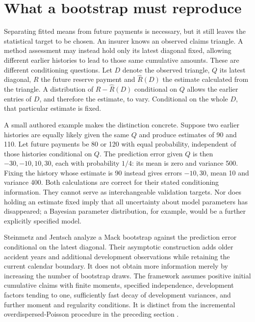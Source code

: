 \section{What a bootstrap must reproduce}
\label{sec:bootstrap-consistency}

Separating fitted means from future payments is necessary, but it still leaves
the statistical target to be chosen. An insurer knows an observed claims
triangle. A method assessment may instead hold only its latest diagonal fixed,
allowing different earlier histories to lead to those same cumulative amounts.
These are different conditioning questions. Let $D$ denote the observed
triangle, $Q$ its latest diagonal, $R$ the future reserve payment and
$\widehat R(D)$ the estimate calculated from the triangle. A distribution of
$R-\widehat R(D)$ conditional on $Q$ allows the earlier entries of $D$, and
therefore the estimate, to vary. Conditional on the whole $D$, that particular
estimate is fixed.

A small authored example makes the distinction concrete. Suppose two earlier
histories are equally likely given the same $Q$ and produce estimates of 90
and 110. Let future payments be 80 or 120 with equal probability, independent
of those histories conditional on $Q$. The prediction error given $Q$ is then
$-30,-10,10,30$, each with probability $1/4$: its mean is zero and variance
500. Fixing the history whose estimate is 90 instead gives errors $-10,30$,
mean 10 and variance 400. Both calculations are correct for their stated
conditioning information. They cannot serve as interchangeable validation
targets. Nor does holding an estimate fixed imply that all uncertainty about
model parameters has disappeared; a Bayesian parameter distribution, for
example, would be a further explicitly specified model.

Steinmetz and Jentsch analyze a Mack bootstrap against the prediction error
conditional on the latest diagonal. Their asymptotic construction adds older
accident years and additional development observations while retaining the
current calendar boundary. It does not obtain more information merely by
increasing the number of bootstrap draws. The framework assumes positive
initial cumulative claims with finite moments, specified independence,
development factors tending to one, sufficiently fast decay of development
variances, and further moment and regularity conditions. It is distinct from
the incremental overdispersed-Poisson procedure in the preceding section
\citep[Sections 2--4, especially Assumptions 2.2--2.5]{steinmetz2024bootstrap}.


